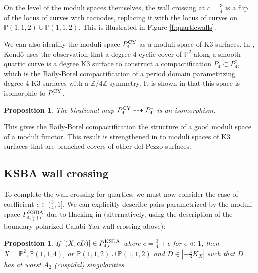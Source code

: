 \documentclass[11pt]{amsart}
\numberwithin{equation}{section}
\newtheorem{prop}[theorem]{Proposition}
\theoremstyle{definition}
\newcommand{\KSBA}{{\rm KSBA}}
\newcommand{\bP}{\mathbb{P}}
\begin{document}
On the level of the moduli spaces themselves, the wall crossing at $c = \frac{3}{4} $ is a flip of the locus of curves with tacnodes, replacing it with the locus of curves on $\bP(1,1,2) \cup \bP(1,1,2)$.  This is illustrated in Figure \ref{f:quarticwalls}.  

We can also identify the moduli space $P^{\rm CY}_4$ as a moduli space of K3 surfaces. In \cite{kondok3}, Kond\={o}  uses the observation 
that a degree 4 cyclic cover of $\bP^2$ along a smooth quartic curve is a degree K3 surface to construct a compactification $P_4\subset P_4^*$, which is the Baily-Borel compactification of a period domain parametrizing 
degree 4 K3 surfaces with a $\mathbb{Z}/4\mathbb{Z}$ symmetry.  It is shown in \cite{BABWILD} that this space is isomorphic to $P^{\rm CY}_4$.

\begin{prop}\label{prop:quartics}
The birational map $P_4^{\rm CY} \dashrightarrow P_4^{*}$ is an isomorphism.
\end{prop}

This gives the Baily-Borel compactification the structure of a good moduli space of a moduli functor.  This result is strengthened in \cite{BL} to moduli spaces of K3 surfaces that are branched covers of other del Pezzo surfaces.



\subsection{KSBA wall crossing}

To complete the wall crossing for quartics, we must now consider the case of coefficient $c \in (\frac{3}{4}, 1]$. We can explicitly describe pairs parametrized by the moduli space $P^\KSBA_{4, \frac{3}{4} +\epsilon}$ due to Hacking in \cite{hacking} (alternatively, using the description of the boundary polarized Calabi Yau wall crossing above): 

\begin{prop}
    If $[(X,cD)] \in P^\KSBA_{4, c}$ where $c = \frac{3}{4} + \epsilon$ for $\epsilon \ll 1$, then $X = \bP^2, \bP(1,1,4)$, or $\bP(1,1,2) \cup \bP(1,1,2)$ and $D \in |-\frac{4}{3}K_X|$ such that $D$ has at worst $A_2$ (cuspidal) singularities. 
\end{prop}
\end{document}
